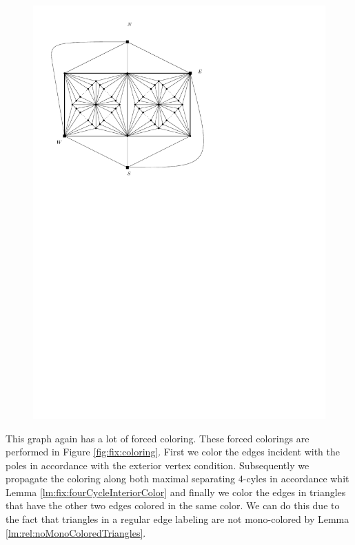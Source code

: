   \begin{figure}[h]
    \centering
    \includegraphics[scale=1]{fixExtension/img/manymanybase}
    \caption{}
    \label{fig:fix:manymany0}
  \end{figure}

  This graph again has a lot of forced coloring. These forced colorings are performed in Figure \ref{fig:fix:coloring}. First we color the edges incident with the poles in accordance with the exterior vertex condition. Subsequently we propagate the coloring along both maximal separating $4$-cyles in accordance whit Lemma \ref{lm:fix:fourCycleInteriorColor} and finally we color the edges in triangles that have the other two edges colored in the same color. We can do this due to the fact that triangles in a regular edge labeling are not mono-colored by Lemma \ref{lm:rel:noMonoColoredTriangles}.


